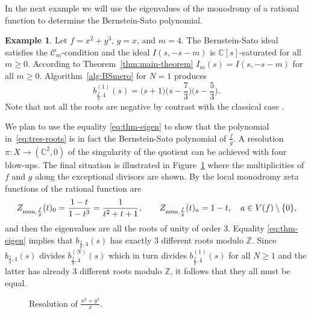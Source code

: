 \documentclass[a4paper,12pt]{amsart}
\theoremstyle{plain}
\theoremstyle{definition}
\newtheorem{ex}[theorem]{Example}
\theoremstyle{remark}
\def\CC{\mathbb{C}}
\def\ZZ{\mathbb{Z}}
\begin{document}
In the next example we will use the eigenvalues of the monodromy of a rational function \cite{MR1647824,MR1734347}
to determine the Bernstein-Sato polynomial.

\begin{ex}
Let $f=x^2+y^3$, $g = x$, and $m=4$. The Bernstein-Sato ideal satisfies the $\mathcal{C}_m$-condition and
the ideal $I(s,-s-m)$ is $\CC[s]$-saturated for all $m\geq 0$. According to Theorem~\ref{thm:main-theorem}
$I_m(s) = I(s,-s-m)$ for all $m \geq 0$.
Algorithm~\ref{alg:BSmero} for $N=1$ produces
\begin{equation}\label{eq:tres-roots}
b_{\frac{f}{g},4}^{(1)}(s) = \Big(s+1\Big) \Big(s-\frac{7}{3}\Big) \Big(s-\frac{5}{3}\Big).
\end{equation}
Note that not all the roots are negative by contrast with the classical case \cite{Kas76}.

We plan to use the equality \eqref{eq:thm-eigen} to show that the polynomial in~\eqref{eq:tres-roots}
is in fact the Bernstein-Sato polynomial of $\frac{f}{g}$. A resolution $\pi: X \to (\CC^2,0)$ of the
singularity of the quotient can be achieved with four blow-ups.
The final situation is illustrated in Figure~\ref{fig:resolution} where the multiplicities
of $f$ and $g$ along the exceptional divisors are shown.
By \cite[Theorem 1]{MR1647824} the local monodromy zeta functions of the rational function are
\[
Z_{{\rm mon},\frac{f}{g}}(t)_0 = \frac{1-t}{1-t^3} = \frac{1}{t^2+t+1},
\qquad Z_{{\rm mon},\frac{f}{g}}(t)_a = 1-t, \quad a \in V(f) \setminus \{0\},
\]
and then the eigenvalues are all the roots of unity of order $3$.
Equality \eqref{eq:thm-eigen} implies that $b_{\frac{f}{g},4}(s)$ has exactly $3$ different
roots modulo $\ZZ$. Since $b_{\frac{f}{g},4}(s)$ divides $b_{\frac{f}{g},4}^{(N)}(s)$
which in turn divides $b_{\frac{f}{g},4}^{(1)}(s)$ for all $N\geq 1$ and the latter
has already $3$ different roots modulo $\ZZ$, it follows that they all must be equal.

\begin{figure}[ht]
\caption{Resolution of $\frac{x^2+y^3}{x}$.}
\label{fig:resolution}
\end{figure}


\end{ex}
\end{document}
